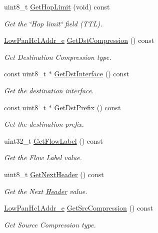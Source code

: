 \begin{DoxyCompactItemize}
uint8\+\_\+t \hyperlink{classns3_1_1SixLowPanHc1_ac653a57636917ee42b9de9e946edab9a}{Get\+Hop\+Limit} (void) const 
\begin{DoxyCompactList}\small\item\em Get the \char`\"{}\+Hop limit\char`\"{} field (T\+TL). \end{DoxyCompactList}\item 
\hyperlink{classns3_1_1SixLowPanHc1_a29c864d9bf6bc466ee2214a95a83dcad}{Low\+Pan\+Hc1\+Addr\+\_\+e} \hyperlink{classns3_1_1SixLowPanHc1_a92252cba4579c06c1095de1012bed919}{Get\+Dst\+Compression} () const 
\begin{DoxyCompactList}\small\item\em Get Destination Compression type. \end{DoxyCompactList}\item 
const uint8\+\_\+t $\ast$ \hyperlink{classns3_1_1SixLowPanHc1_ad0bb8401b9c20ea65d245c1267fa24ee}{Get\+Dst\+Interface} () const 
\begin{DoxyCompactList}\small\item\em Get the destination interface. \end{DoxyCompactList}\item 
const uint8\+\_\+t $\ast$ \hyperlink{classns3_1_1SixLowPanHc1_aacb30a76cd12e06f3bced1ed1b1d3877}{Get\+Dst\+Prefix} () const 
\begin{DoxyCompactList}\small\item\em Get the destination prefix. \end{DoxyCompactList}\item 
uint32\+\_\+t \hyperlink{classns3_1_1SixLowPanHc1_ab3ef7e1baa92b7918a4d79d82d8060bd}{Get\+Flow\+Label} () const 
\begin{DoxyCompactList}\small\item\em Get the Flow Label value. \end{DoxyCompactList}\item 
uint8\+\_\+t \hyperlink{classns3_1_1SixLowPanHc1_ab1d9fd77b41dabbf4c3f789721f1a5e5}{Get\+Next\+Header} () const 
\begin{DoxyCompactList}\small\item\em Get the Next \hyperlink{classns3_1_1Header}{Header} value. \end{DoxyCompactList}\item 
\hyperlink{classns3_1_1SixLowPanHc1_a29c864d9bf6bc466ee2214a95a83dcad}{Low\+Pan\+Hc1\+Addr\+\_\+e} \hyperlink{classns3_1_1SixLowPanHc1_af1138da7fd011938be1a6bc03b932fb8}{Get\+Src\+Compression} () const 
\begin{DoxyCompactList}\small\item\em Get Source Compression type. \end{DoxyCompactList}\item 

\end{DoxyCompactItemize}
